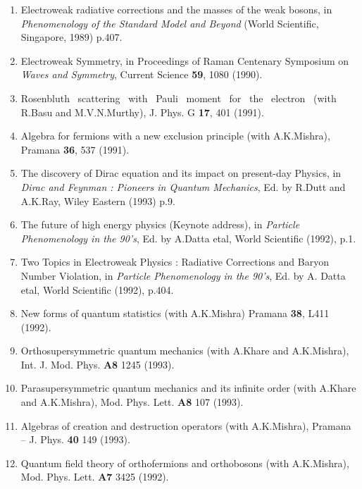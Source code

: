 \begin{enumerate}
\item Electroweak radiative corrections and the masses of the weak
bosons, in {\it Phenomenology of the Standard Model and Beyond} (World
Scientific, Singapore, 1989) p.407.

\item Electroweak Symmetry, in Proceedings of Raman Centenary
Symposium on {\it Waves and Symmetry}, Current Science {\bf 59}, 1080
(1990).

\item Rosenbluth \ scattering \ with \ Pauli \ moment \ for \ the \
electron
\ (with R.Basu and M.V.N.Murthy), J. Phys. G {\bf 17}, 401 (1991).

\item Algebra for fermions with a new exclusion principle (with
A.K.Mishra), Pramana {\bf 36}, 537 (1991).

\item The discovery of Dirac equation and its impact on
present-day Physics, in {\it Dirac and Feynman : Pioneers in Quantum
Mechanics}, Ed. by R.Dutt and A.K.Ray, Wiley Eastern (1993) p.9.

\item The future of high energy physics  (Keynote address), in
{\it Particle Phenomenology in the 90's}, Ed. by
A.Datta etal, World Scientific (1992), p.1.

\item Two Topics in Electroweak Physics : Radiative Corrections
and Baryon Number Violation, in {\it Particle Phenomenology in the
90's}, Ed. by A. Datta etal, World Scientific (1992), p.404.

\item New forms of quantum statistics (with A.K.Mishra) Pramana
{\bf 38}, L411 (1992).

\item Orthosupersymmetric quantum mechanics (with A.Khare and
A.K.Mishra), Int. J. Mod. Phys. {\bf A8} 1245 (1993).

\item Parasupersymmetric quantum mechanics and its infinite order
(with A.Khare and A.K.Mishra), Mod. Phys. Lett. {\bf A8} 107 (1993). 

\item Algebras of creation and destruction operators (with
A.K.Mishra), Pramana -- J. Phys. {\bf 40} 149 (1993).

\item Quantum field theory of orthofermions and orthobosons (with
A.K.Mishra), Mod. Phys. Lett. {\bf A7} 3425 (1992).


\end{enumerate}
